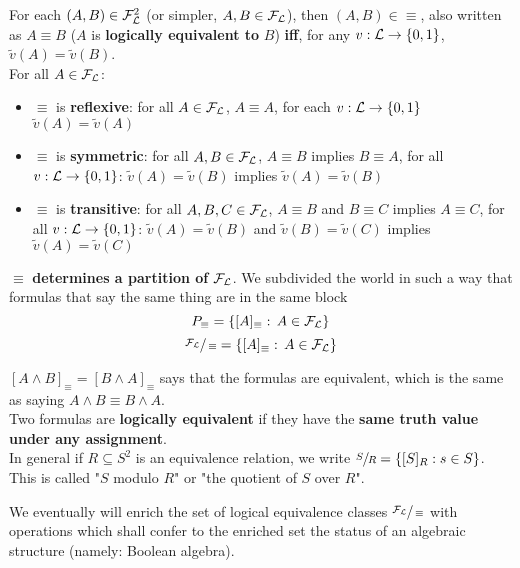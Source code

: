 	For each $(A, B) \in \mathcal{F}_\mathcal{L}^2$ (or simpler, $A, B \in \mathcal{F}_\mathcal{L}$), then $(A, B) \in \equiv$, also written as $A \equiv B$ ($A$ is \textbf{logically equivalent to} $B$) \textbf{iff}, for any $v: \mathcal{L} \rightarrow \{0,1\}$, $\tilde{v}(A) = \tilde{v} (B)$.\\

	For all $A \in \mathcal{F}_\mathcal{L}$:
	\begin{itemize}
		\item $\equiv$ is \textbf{reflexive}: for all $A \in \mathcal{F}_\mathcal{L}$, $A \equiv A$, for each $v: \mathcal{L} \rightarrow \{0,1\}$ $\tilde{v} (A) = \tilde{v}(A)$

		\item $\equiv$ is \textbf{symmetric}: for all $A,B \in \mathcal{F}_\mathcal{L}$, $A \equiv B$ implies $B \equiv A$, for all $v: \mathcal{L} \rightarrow \{0,1\}$: $\tilde{v}(A) = \tilde{v}(B)$ implies $\tilde{v}(A) = \tilde{v}(B)$

		\item $\equiv$ is \textbf{transitive}: for all $A,B,C \in \mathcal{F}_\mathcal{L}$, $A \equiv B$ and $B \equiv C$ implies $A \equiv C$, for all $v: \mathcal{L} \rightarrow \{0,1\}$: $\tilde{v}(A) = \tilde{v}(B)$ and $\tilde{v}(B) = \tilde{v}(C)$ implies $\tilde{v}(A) = \tilde{v}(C)$
	\end{itemize}

	\newpage

	$\equiv$ \textbf{determines a partition of} $\mathcal{F}_\mathcal{L}$. We subdivided the world in such a way that formulas that say the same thing are in the same block
	$$ P_\equiv = \{[A]_\equiv : \, A \in \mathcal{F}_\mathcal{L}\}$$
	$$ \sfrac{\mathcal{F}_\mathcal{L}}{\equiv} = \{[A]_\equiv : \, A \in \mathcal{F}_\mathcal{L}\}$$

	$[A \wedge B]_\equiv = [B \wedge A]_\equiv$ says that the formulas are equivalent, which is the same as saying $A \wedge B \equiv B \wedge A$.\\

	Two formulas are \textbf{logically equivalent} if they have the \textbf{same truth value under any assignment}.\\

	In general if $R \subseteq S^2$ is an equivalence relation, we write $\sfrac{S}{R} = \{[S]_R : s \in S\}$. This is called "$S$ modulo $R$" or "the quotient of $S$ over $R$".\\

	\vfill

	We eventually will enrich the set of logical equivalence classes $\sfrac{\mathcal{F}_\mathcal{L}}{\equiv}$ with operations which shall confer to the enriched set the status of an algebraic structure (namely: Boolean algebra).\\

	\newpage

